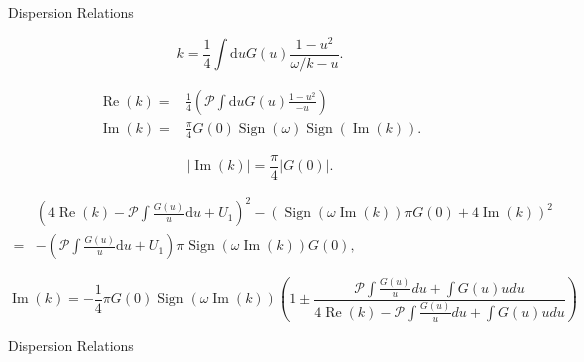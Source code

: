\documentclass[9pt]{beamer}
\begin{document}
\begin{darkframes}
\begin{frame}{Dispersion Relations}

\begin{equation*}
   k = \frac{1}{4} \int \mathrm du G(u) \frac{ 1 - u^2 }{ \omega/k - u }.
   \label{eqn-k-omega-relation}
\end{equation*}


\begin{align*}
\operatorname{Re}(k) =& \frac{1}{4}\left(  \mathcal{P} \int \mathrm d u G(u) \frac{ 1 - u^2 }{ - u }  \right)\label{eqn-re-k-arbitrary-spectrum} \\
\operatorname{Im}(k) =&  \frac{\pi}{4}G(0) \operatorname{Sign}\left( \omega \right) \operatorname{Sign}\left(  \operatorname{Im}(k)  \right).
\end{align*}

\begin{equation*}
   \lvert \operatorname{Im}(k) \rvert  =  \frac{\pi}{4}\lvert G(0)\rvert .
\end{equation*}



\begin{align*}
&\left(4\operatorname{Re}(k) - \mathcal P \int \frac{G(u)}{u} \mathrm d u + U_1 \right)^2  - \left( \operatorname{Sign}(\omega \operatorname{Im}(k) )\pi G(0) +4 \operatorname{Im}(k) \right)^2 \\
=& - \left( \mathcal P \int \frac{G(u)}{u} \mathrm du + U_1 \right) \pi \operatorname{Sign}(\omega \operatorname{Im}(k) ) G(0),
\end{align*}

\begin{equation*}
   \operatorname{Im}(k) = - \frac{1}{4} \pi G(0) \operatorname{Sign}(\omega \operatorname{Im}(k) ) \left(  1 \pm \frac{ \mathscr P \int \frac{G(u)}{u} du + \int G(u) u du }{ 4 \operatorname{Re}(k) - \mathscr P \int \frac{G(u)}{u} du + \int G(u) u du }  \right)
\end{equation*}

\end{frame}



\begin{frame}{Dispersion Relations}


\end{frame}
\end{darkframes}
\end{document}
